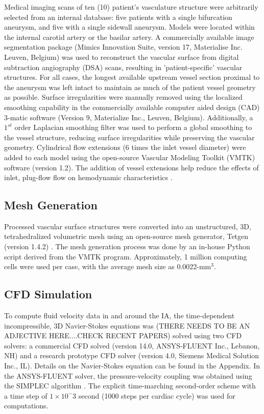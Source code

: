 Medical imaging scans of ten (10) patient's vasculature structure were arbitrarily selected from an internal database: five patients with a single bifurcation aneurysm, and five with a single sidewall aneurysm. Models were located within the internal carotid artery or the basilar artery. A commercially available image segmentation package (Mimics Innovation Suite, version 17, Materialise Inc. Leuven, Belgium) was used to reconstruct the vascular surface from digital subtraction angiography (DSA) scans, resulting in 'patient-specific' vascular structures. For all cases, the longest available upstream vessel section proximal to the aneurysm was left intact to maintain as much of the patient vessel geometry as possible. Surface irregularities were manually removed using the localized smoothing capability in the commercially available computer aided design (CAD) 3-matic software (Version 9, Materialize Inc., Leuven, Belgium). Additionally, a $1^{st}$ order Laplacian smoothing filter was used to perform a global smoothing to the vessel structure, reducing surface irregularities while preserving the vascular geometry. Cylindrical flow extensions (6 times the inlet vessel diameter) were added to each model using the open-source Vascular Modeling Toolkit (VMTK) software (version 1.2). The addition of vessel extensions help reduce the effects of inlet, plug-flow flow on hemodynamic characteristics \cite{poethke2009cerebral}.

\subsection{Mesh Generation}\label{CHAPTER2_SECTION1_SUBSECTION2}
Processed vascular surface structures were converted into an unstructured, 3D, tetrahedralized volumetric mesh using an open-source mesh generator, Tetgen (version 1.4.2) \cite{si20113d}. The mesh generation process was done by an in-house Python script derived from the VMTK program. Approximately, 1 million computing cells were used per case, with the average mesh size as 0.0022-mm$^{3}$.

\subsection{CFD Simulation}\label{CHAPTER2_SECTION1_SUBSECTION3}
To compute fluid velocity data in and around the IA, the time-dependent incompressible, 3D Navier-Stokes equations was  (THERE NEEDS TO BE AN ADJECTIVE HERE....CHECK RECENT PAPERS) solved using two CFD solvers: a commercial CFD solved (version 14.0, ANSYS-FLUENT Inc., Lebanon, NH) and a research prototype CFD solver (version 4.0, Siemens Medical Solution Inc., IL). Details on the Navier-Stokes equation can be found in the Appendix.  In the ANSYS-FLUENT solver, the pressure-velocity coupling was obtained using the SIMPLEC algorithm \cite{versteeg2007introduction}. The explicit time-marching second-order scheme with a time step of $1\times 10^-3$ second (1000 steps per cardiac cycle) was used for computations.

